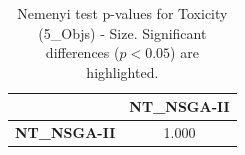 \begin{table}[h!]
\centering
\scriptsize
\begin{tabular}{lc}
\toprule
 & NT\_NSGA-II \\
\midrule
\textbf{NT\_NSGA-II} & 1.000 \\
\bottomrule
\end{tabular}
\caption{Nemenyi test p-values for Toxicity (5_Objs) - Size. Significant differences ($p < 0.05$) are highlighted.}
\label{tab:nemenyi_nemenyi_Toxicity_5_Objs_Test_Size}
\end{table}